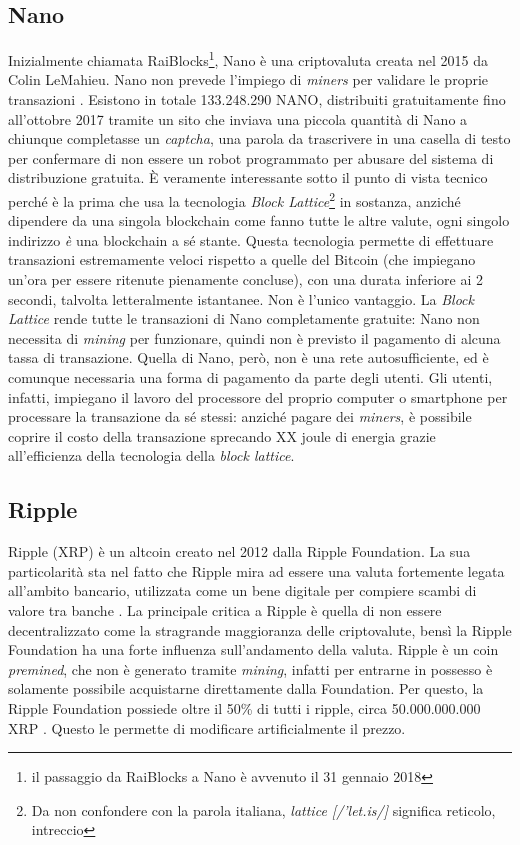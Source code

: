 \documentclass {article}
\begin{document}
\subsection {Nano}


Inizialmente chiamata RaiBlocks\footnote{il passaggio da RaiBlocks a Nano è avvenuto il 31 gennaio 2018}, Nano è una criptovaluta creata nel 2015 da Colin LeMahieu.
Nano non prevede l'impiego di \textit{miners} per validare le proprie transazioni \cite{nanofaq}.
Esistono in totale 133.248.290 NANO, distribuiti gratuitamente fino all'ottobre 2017 tramite un sito che inviava una piccola quantità di Nano a chiunque completasse un \textit{captcha}, una parola da trascrivere in una casella di testo per confermare di non essere un robot programmato per abusare del sistema di distribuzione gratuita.
È veramente interessante sotto il punto di vista tecnico perché è la prima che usa la tecnologia \textit{Block Lattice}\footnote{Da non confondere con la parola italiana, \textit{lattice [/'let.is/]} significa reticolo, intreccio} in sostanza, anziché dipendere da una singola blockchain come fanno tutte le altre valute, ogni singolo indirizzo \emph{è} una blockchain a sé stante.
Questa tecnologia permette di effettuare transazioni estremamente veloci rispetto a quelle del Bitcoin (che impiegano un'ora per essere ritenute pienamente concluse), con una durata inferiore ai 2 secondi, talvolta letteralmente istantanee.
Non è l'unico vantaggio.%
La \textit{Block Lattice} rende tutte le transazioni di Nano completamente gratuite: Nano non necessita di \textit{mining} per funzionare, quindi non è previsto il pagamento di alcuna tassa di transazione.
Quella di Nano, però, non è una rete autosufficiente, ed è comunque necessaria una forma di pagamento da parte degli utenti.
Gli utenti, infatti, impiegano il lavoro del processore del proprio computer o smartphone per processare la transazione da sé stessi: anziché pagare dei \textit{miners}, è possibile coprire il costo della transazione sprecando XX joule di energia grazie all'efficienza della tecnologia della \textit{block lattice}.


\subsection {Ripple}


Ripple (XRP) è un altcoin creato nel 2012 dalla Ripple Foundation.
La sua particolarità sta nel fatto che Ripple mira ad essere una valuta fortemente legata all'ambito bancario, utilizzata come un bene digitale per compiere scambi di valore tra banche \cite{whatsripple}.
La principale critica a Ripple è quella di non essere decentralizzato come la stragrande maggioranza delle criptovalute, bensì la Ripple Foundation ha una forte influenza sull'andamento della valuta.
Ripple è un coin \textit{premined}, che non è generato tramite \textit{mining}, infatti per entrarne in possesso è solamente possibile acquistarne direttamente dalla Foundation.
Per questo, la Ripple Foundation possiede oltre il 50\% di tutti i ripple, circa 50.000.000.000 XRP \cite{ripple}. Questo le permette di modificare artificialmente il prezzo.
\end{document}
